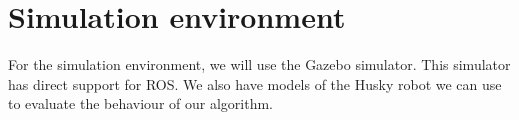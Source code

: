 \section{Simulation environment}
    For the simulation environment, we will use the Gazebo simulator. This simulator has direct support for ROS. We also have models of the Husky robot we can use to evaluate the behaviour of our algorithm.